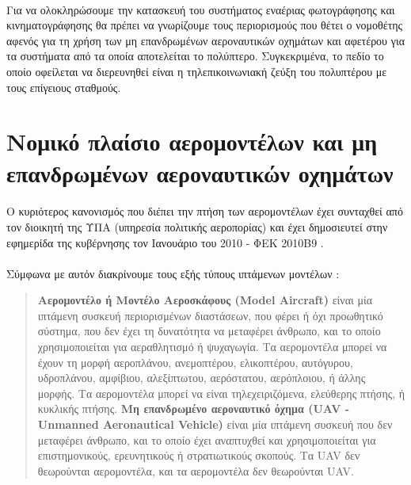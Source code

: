 \documentclass[a4paper, 12pt, twoside]{report}
\begin{document}
{{{{{{		\paragraph{}{Για να ολοκληρώσουμε την κατασκευή του συστήματος εναέριας φωτογράφησης και κινηματογράφησης θα πρέπει να γνωρίζουμε τους περιορισμούς που θέτει ο νομοθέτης αφενός για τη χρήση των μη επανδρωμένων αεροναυτικών οχημάτων και αφετέρου για τα συστήματα από τα οποία αποτελείται το πολύπτερο. Συγκεκριμένα, το πεδίο το οποίο οφείλεται να διερευνηθεί είναι η τηλεπικοινωνιακή ζεύξη του πολυπτέρου με τους επίγειους σταθμούς. 
			}
			
		\section{Νομικό πλαίσιο αερομοντέλων και μη επανδρωμένων αεροναυτικών οχημάτων}
			
			\paragraph{}{Ο κυριότερος κανονισμός που διέπει την πτήση των αερομοντέλων έχει συνταχθεί από τον διοικητή της ΥΠΑ (υπηρεσία πολιτικής αεροπορίας) και έχει δημοσιευτεί στην εφημερίδα της κυβέρνησης τον Ιανουάριο του 2010 - ΦΕΚ 2010Β9 \cite{ΦΕΚ2010Β9}.
			}
			\paragraph{}{Σύμφωνα με αυτόν διακρίνουμε τους εξής τύπους ιπτάμενων μοντέλων :
			\begin{quote}
				\textbf{Αερομοντέλο ή Μοντέλο Αεροσκάφους (Model Aircraft)} είναι μία ιπτάμενη συσκευή περιορισμένων διαστάσεων, που φέρει ή όχι προωθητικό σύστημα, που δεν έχει τη δυνατότητα να μεταφέρει άνθρωπο, και το οποίο χρησιμοποιείται για αεραθλητισμό ή ψυχαγωγία. Τα αερομοντέλα μπορεί να έχουν τη μορφή αεροπλάνου, ανεμοπτέρου, ελικοπτέρου, αυτόγυρου, υδροπλάνου, αμφίβιου, αλεξίπτωτου, αερόστατου, αερόπλοιου, ή άλλης μορφής. Τα αερομοντέλα μπορεί να είναι τηλεχειριζόμενα, ελεύθερης πτήσης, ή κυκλικής πτήσης.\linebreak
				\textbf{Μη επανδρωμένο αεροναυτικό όχημα (UAV - Unmanned Aeronautical Vehicle)} είναι μία ιπτάμενη συσκευή που δεν μεταφέρει άνθρωπο, και το οποίο έχει αναπτυχθεί και χρησιμοποιείται για επιστημονικούς, ερευνητικούς ή στρατιωτικούς σκοπούς. Τα UAV δεν θεωρούνται αερομοντέλα, και τα αερομοντέλα δεν θεωρούνται UAV.			
			\end{quote}
			}
}}}}}}
\end{document}
